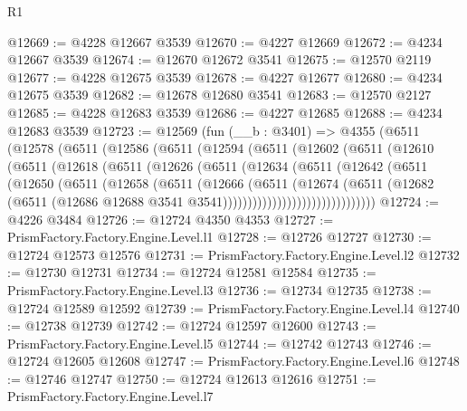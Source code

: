 \begin{lexlean}{R1}
\begin{coremodule}
@12669 := @4228 @12667 @3539
@12670 := @4227 @12669
@12672 := @4234 @12667 @3539
@12674 := @12670 @12672 @3541
@12675 := @12570 @2119
@12677 := @4228 @12675 @3539
@12678 := @4227 @12677
@12680 := @4234 @12675 @3539
@12682 := @12678 @12680 @3541
@12683 := @12570 @2127
@12685 := @4228 @12683 @3539
@12686 := @4227 @12685
@12688 := @4234 @12683 @3539
@12723 := @12569
    (fun (__b : @3401) =>
    @4355
      (@6511
        (@12578
          (@6511
            (@12586
              (@6511
                (@12594
                  (@6511
                    (@12602
                      (@6511
                        (@12610
                          (@6511
                            (@12618
                              (@6511
                                (@12626
                                  (@6511
                                    (@12634
                                      (@6511
                                        (@12642
                                          (@6511
                                            (@12650
                                              (@6511
                                                (@12658
                                                  (@6511
                                                    (@12666
                                                      (@6511
                                                        (@12674
                                                          (@6511
                                                            (@12682
                                                              (@6511
                                                                (@12686
                                                                  @12688
                                                                  @3541
                                                                  @3541)))))))))))))))))))))))))))))))
@12724 := @4226 @3484
@12726 := @12724 @4350 @4353
@12727 := PrismFactory.Factory.Engine.Level.l1
@12728 := @12726 @12727
@12730 := @12724 @12573 @12576
@12731 := PrismFactory.Factory.Engine.Level.l2
@12732 := @12730 @12731
@12734 := @12724 @12581 @12584
@12735 := PrismFactory.Factory.Engine.Level.l3
@12736 := @12734 @12735
@12738 := @12724 @12589 @12592
@12739 := PrismFactory.Factory.Engine.Level.l4
@12740 := @12738 @12739
@12742 := @12724 @12597 @12600
@12743 := PrismFactory.Factory.Engine.Level.l5
@12744 := @12742 @12743
@12746 := @12724 @12605 @12608
@12747 := PrismFactory.Factory.Engine.Level.l6
@12748 := @12746 @12747
@12750 := @12724 @12613 @12616
@12751 := PrismFactory.Factory.Engine.Level.l7

\end{coremodule}
\end{lexlean}
